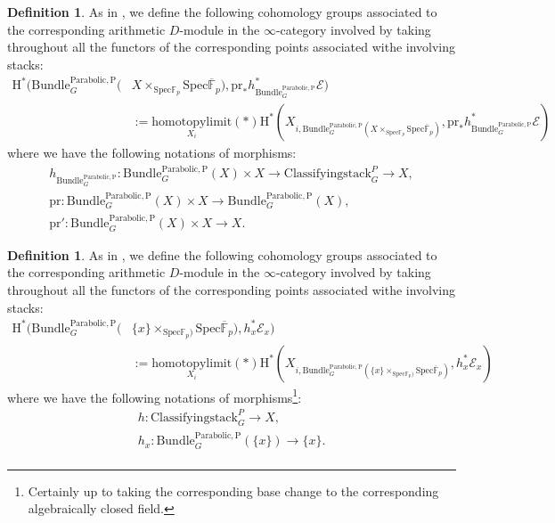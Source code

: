 \documentclass[11pt]{book}
\theoremstyle{definition}
\newtheorem{definition}[theorem]{Definition}
\numberwithin{equation}{section}
\begin{document}
\begin{definition}
As in \cite[Construction 3.2.5.1]{GL1}, we define the following cohomology groups associated to the corresponding arithmetic $D$-module in the $\infty$-category involved by taking throughout all the functors of the corresponding points associated withe involving stacks:
\begin{align}
\mathrm{H}^*(\mathrm{Bundle}^\mathrm{Parabolic,P}_G(&X\times_{\mathrm{Spec}\mathbb{F}_p} \mathrm{Spec}\overline{\mathbb{F}}_p),\mathrm{pr}_*h_{\mathrm{Bundle}^\mathrm{Parabolic,P}_G}^*\mathcal{E})\\
&:=\underset{X_i}{\mathrm{homotopylimit}}(*)\mathrm{H}^*(X_{i,\mathrm{Bundle}^\mathrm{Parabolic,P}_G(X\times_{\mathrm{Spec}\mathbb{F}_p} \mathrm{Spec}\overline{\mathbb{F}}_p)},\mathrm{pr}_*h_{\mathrm{Bundle}^\mathrm{Parabolic,P}_G}^*\mathcal{E})
\end{align}
where we have the following notations of morphisms:
\begin{align}
h_{\mathrm{Bundle}^\mathrm{Parabolic,P}_G}:\mathrm{Bundle}^\mathrm{Parabolic,P}_G(X)\times X\rightarrow \mathrm{Classifyingstack}^P_G\rightarrow X,\\
\mathrm{pr}:\mathrm{Bundle}^\mathrm{Parabolic,P}_G(X)\times X\rightarrow \mathrm{Bundle}^\mathrm{Parabolic,P}_G(X),\\
\mathrm{pr}': \mathrm{Bundle}^\mathrm{Parabolic,P}_G(X)\times X\rightarrow X.	
\end{align}
	
\end{definition}


\begin{definition}
As in \cite[Construction 3.2.5.1]{GL1}, we define the following cohomology groups associated to the corresponding arithmetic $D$-module in the $\infty$-category involved by taking throughout all the functors of the corresponding points associated withe involving stacks:
\begin{align}
\mathrm{H}^*(\mathrm{Bundle}^\mathrm{Parabolic,P}_G(&\{x\}\times_{\mathrm{Spec}\mathbb{F}_p)} \mathrm{Spec}\overline{\mathbb{F}}_p),h_x^*{\mathcal{E}}_x)\\
&:=\underset{X_i}{\mathrm{homotopylimit}}(*)\mathrm{H}^*(X_{i,\mathrm{Bundle}^\mathrm{Parabolic,P}_G(\{x\}\times_{\mathrm{Spec}\mathbb{F}_p)} \mathrm{Spec}\overline{\mathbb{F}}_p)},h_x^*{\mathcal{E}}_x)
\end{align}
where we have the following notations of morphisms\footnote{Certainly up to taking the corresponding base change to the corresponding algebraically closed field.}:
\begin{align}
h:\mathrm{Classifyingstack}^P_G\rightarrow X,\\
h_x:\mathrm{Bundle}^\mathrm{Parabolic,P}_G(\{x\})\rightarrow \{x\}.\\	
\end{align}
	
\end{definition}
\end{document}
